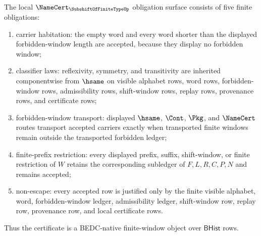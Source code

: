 \begin{theorem}
\label{thm:subshift-finite-type-namecert-obligations}
\label{thm:subshift-of-finite-type-namecert-obligations}
The local $\NameCert_{\SubshiftOfFiniteTypeUp}$ obligation surface consists of five finite obligations:
\begin{enumerate}
\item carrier habitation: the empty word and every word shorter than the displayed forbidden-window length are accepted, because they display no forbidden window;
\item classifier laws: reflexivity, symmetry, and transitivity are inherited componentwise from $\hsame$ on visible alphabet rows, word rows, forbidden-window rows, admissibility rows, shift-window rows, replay rows, provenance rows, and certificate rows;
\item forbidden-window transport: displayed $\hsame$, $\Cont$, $\Pkg$, and $\NameCert$ routes transport accepted carriers exactly when transported finite windows remain outside the transported forbidden ledger;
\item finite-prefix restriction: every displayed prefix, suffix, shift-window, or finite restriction of $W$ retains the corresponding subledger of $F,L,R,C,P,N$ and remains accepted;
\item non-escape: every accepted row is justified only by the finite visible alphabet, word, forbidden-window ledger, admissibility ledger, shift-window row, replay row, provenance row, and local certificate rows.
\end{enumerate}
Thus the certificate is a BEDC-native finite-window object over $\mathsf{BHist}$ rows.
\end{theorem}
